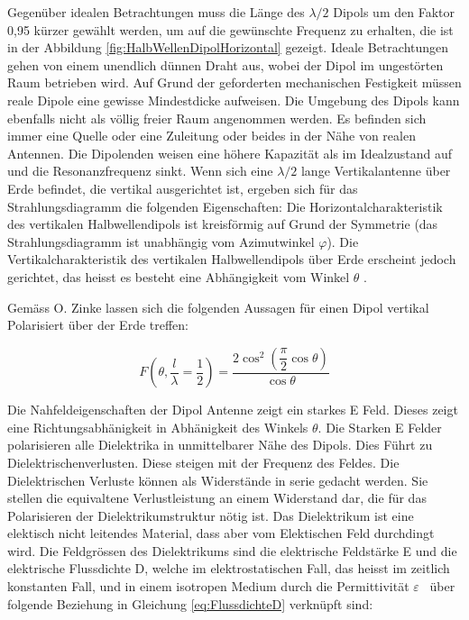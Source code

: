 Gegenüber idealen Betrachtungen muss die Länge des $\lambda /2$ Dipols um den Faktor 0,95
kürzer gewählt werden, um auf die gewünschte Frequenz zu erhalten, die ist in der Abbildung \ref{fig:HalbWellenDipolHorizontal} gezeigt.
Ideale Betrachtungen gehen von einem unendlich dünnen Draht aus, wobei der Dipol im
ungestörten Raum betrieben wird. Auf Grund der geforderten mechanischen Festigkeit
müssen reale Dipole eine gewisse Mindestdicke aufweisen. Die Umgebung des Dipols kann
ebenfalls nicht als völlig freier Raum angenommen werden. Es befinden sich immer eine Quelle oder eine Zuleitung oder beides in der Nähe von realen Antennen. Die Dipolenden weisen eine höhere Kapazität als im Idealzustand auf und die Resonanzfrequenz sinkt. Wenn sich eine $\lambda /2$ lange Vertikalantenne über Erde befindet, die vertikal ausgerichtet ist, ergeben sich für das Strahlungsdiagramm die folgenden Eigenschaften: 
Die Horizontalcharakteristik des vertikalen Halbwellendipols ist kreisförmig auf Grund der Symmetrie (das Strahlungsdiagramm ist unabhängig vom Azimutwinkel $\varphi$). Die Vertikalcharakteristik des vertikalen Halbwellendipols über Erde erscheint jedoch gerichtet, das heisst es besteht eine Abhängigkeit vom Winkel $\theta$ . 

Gemäss O. Zinke %
 lassen sich die folgenden Aussagen für einen Dipol vertikal Polarisiert über der Erde treffen:


\begin{equation}\label{eq:FDipolTheat}
F(\theta,\frac{l}{\lambda}=\dfrac{1}{2})=\dfrac{2\cos^{2}(\dfrac{\pi}{2}\cos\theta)}{\cos\theta}
\end{equation}


Die Nahfeldeigenschaften der Dipol Antenne zeigt ein starkes E Feld. Dieses zeigt eine Richtungsabhänigkeit in Abhänigkeit des Winkels $\theta$. Die Starken E Felder polarisieren alle Dielektrika in unmittelbarer Nähe des Dipols. Dies Führt zu Dielektrischenverlusten. Diese steigen mit der Frequenz des Feldes. Die Dielektrischen Verluste können als Widerstände in serie gedacht werden. Sie stellen die equivaltene Verlustleistung an einem Widerstand dar, die für das Polarisieren der Dielektrikumstruktur nötig ist.
Das Dielektrikum ist eine elektisch nicht leitendes Material, dass aber vom Elektischen Feld durchdingt wird. Die Feldgrössen des Dielektrikums sind die elektrische Feldstärke E und die elektrische Flussdichte D, welche im elektrostatischen Fall, das heisst im zeitlich konstanten Fall, und in einem isotropen Medium durch die Permittivität $\varepsilon $ \ über folgende Beziehung in Gleichung \ref{eq:FlussdichteD} verknüpft sind:


